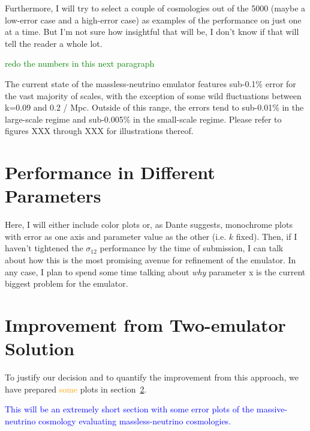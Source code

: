 Furthermore, I will try to select a couple of cosmologies out of the 5000 
(maybe a low-error case and a high-error case) as examples of the performance 
on just one at a time. But I'm not sure how insightful that will be, I don't 
know if that will tell the reader a whole lot.

\textcolor{green}{redo the numbers in this next paragraph}

The current state of the massless-neutrino emulator features sub-0.1\% error 
for the vast majority of scales, with the exception of some wild fluctuations  
between k=0.09 and 0.2 / Mpc. Outside of this range, the errors tend to 
sub-0.01\% in the large-scale regime and sub-0.005\% in the small-scale 
regime. Please refer to figures XXX through XXX for illustrations thereof.


\section{Performance in Different Parameters}

Here, I will either include color plots or, as Dante suggests, monochrome 
plots with error as one axis and parameter value as the other (i.e. $k$ 
fixed). Then, if I haven't tightened the $\sigma_{12}$ performance by the time 
of submission, I can talk about how this is the most promising avenue for 
refinement of the emulator. In any case, I plan to spend some time talking 
about \textit{why} parameter x is the current biggest problem for the 
emulator. 


\section{Improvement from Two-emulator Solution}
\label{sec: 2emu_improvement}

To justify our decision and to quantify the improvement from this approach, we
have prepared \textcolor{orange}{some} plots in
section~\ref{sec: 2emu_improvement}.

\textcolor{blue}{This will be an extremely short section with some error
plots of the massive-neutrino cosmology evaluating massless-neutrino
cosmologies.}